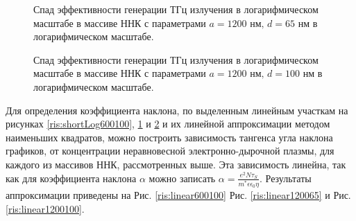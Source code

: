 \documentclass[a4paper,14pt,russian]{extreport}
\begin{document}
				\begin{figure}[H]
					\caption{Спад эффективности генерации ТГц излучения в логарифмическом масштабе в массиве ННК с параметрами $a = 1200 \text{ нм, } d = 65 \text{ нм}$ в логарифмическом масштабе.}
				\label{ris:shortLog120065}
				\end{figure}
				\begin{figure}[H]
					\caption{Спад эффективности генерации ТГц излучения в логарифмическом масштабе в массиве ННК с параметрами $a = 1200 \text{ нм, } d = 100 \text{ нм}$ в логарифмическом масштабе.}
				\label{ris:shortLog1200100}
				\end{figure}
				Для определения коэффициента наклона, по выделенным линейным участкам на рисунках \ref{ris:shortLog600100},  \ref{ris:shortLog120065} и \ref{ris:shortLog1200100} и их линейной аппроксимации методом наименьших квадратов, можно построить зависимость тангенса угла наклона графиков, от концентрации неравновесной электронно-дырочной плазмы, для каждого из массивов ННК, рассмотренных выше. Эта зависимость линейна, так как для коэффициента наклона $\alpha$ можно записать $\alpha = \frac{e^2N\tau_S}{m^*\epsilon \epsilon_0 \eta}$. Результаты аппроксимации приведены на Рис. \ref{ris:linear600100} Рис. \ref{ris:linear120065} и Рис. \ref{ris:linear1200100}.\par
\end{document}
